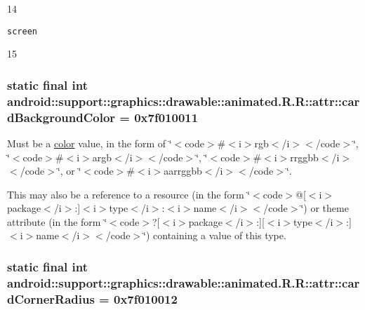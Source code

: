 14

{\tt screen}

15\hypertarget{classandroid_1_1support_1_1graphics_1_1drawable_1_1animated_1_1_r_1_1attr_f60fcdfe4abb5cb3de92e564ab3a9827}{
\subsubsection[{cardBackgroundColor}]{\setlength{\rightskip}{0pt plus 5cm}static final int android::support::graphics::drawable::animated.R.R::attr::cardBackgroundColor = 0x7f010011}}
\label{classandroid_1_1support_1_1graphics_1_1drawable_1_1animated_1_1_r_1_1attr_f60fcdfe4abb5cb3de92e564ab3a9827}


Must be a \hyperlink{classandroid_1_1support_1_1graphics_1_1drawable_1_1animated_1_1_r_1_1color}{color} value, in the form of \char`\"{}$<$code$>$\#$<$i$>$rgb$<$/i$>$$<$/code$>$\char`\"{}, \char`\"{}$<$code$>$\#$<$i$>$argb$<$/i$>$$<$/code$>$\char`\"{}, \char`\"{}$<$code$>$\#$<$i$>$rrggbb$<$/i$>$$<$/code$>$\char`\"{}, or \char`\"{}$<$code$>$\#$<$i$>$aarrggbb$<$/i$>$$<$/code$>$\char`\"{}. 

This may also be a reference to a resource (in the form \char`\"{}$<$code$>$@\mbox{[}$<$i$>$package$<$/i$>$:\mbox{]}$<$i$>$type$<$/i$>$:$<$i$>$name$<$/i$>$$<$/code$>$\char`\"{}) or theme attribute (in the form \char`\"{}$<$code$>$?\mbox{[}$<$i$>$package$<$/i$>$:\mbox{]}\mbox{[}$<$i$>$type$<$/i$>$:\mbox{]}$<$i$>$name$<$/i$>$$<$/code$>$\char`\"{}) containing a value of this type. \hypertarget{classandroid_1_1support_1_1graphics_1_1drawable_1_1animated_1_1_r_1_1attr_f672cfb041ab4a8597fdbe74203b9032}{
\subsubsection[{cardCornerRadius}]{\setlength{\rightskip}{0pt plus 5cm}static final int android::support::graphics::drawable::animated.R.R::attr::cardCornerRadius = 0x7f010012}}
\label{classandroid_1_1support_1_1graphics_1_1drawable_1_1animated_1_1_r_1_1attr_f672cfb041ab4a8597fdbe74203b9032}


